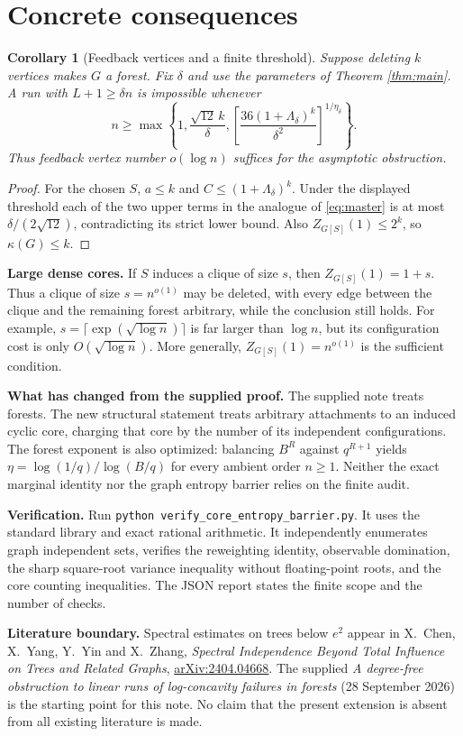 \documentclass[10pt]{article}
\newtheorem{corollary}[theorem]{Corollary}
\begin{document}
\section{Concrete consequences}
\begin{corollary}[Feedback vertices and a finite threshold]
Suppose deleting \(k\) vertices makes \(G\) a forest. Fix \(\delta\) and
use the parameters of Theorem \ref{thm:main}. A run with
\(L+1\ge\delta n\) is impossible whenever
\[
 n\ge\max\left\{1,\frac{\sqrt{12}\,k}{\delta},
       \left[\frac{36(1+\Lambda_\delta)^k}{\delta^2}
                  \right]^{1/\eta_\delta}\right\}.
\]
Thus feedback vertex number \(o(\log n)\) suffices for the asymptotic
obstruction.
\end{corollary}
\begin{proof}
For the chosen \(S\), \(a\le k\) and
\(C\le(1+\Lambda_\delta)^k\). Under the displayed threshold each of
the two upper terms in the analogue of \eqref{eq:master} is at most
\(\delta/(2\sqrt{12})\), contradicting its strict lower bound.
Also \(Z_{G[S]}(1)\le2^k\), so \(\kappa(G)\le k\).
\end{proof}

\noindent\textbf{Large dense cores.} If \(S\) induces a clique of size
\(s\), then \(Z_{G[S]}(1)=1+s\). Thus a clique of size \(s=n^{o(1)}\)
may be deleted, with every edge between the clique and the remaining
forest arbitrary, while the conclusion still holds. For example,
\(s=\lceil\exp(\sqrt{\log n})\rceil\) is far larger than \(\log n\),
but its configuration cost is only \(O(\sqrt{\log n})\).
More generally, \(Z_{G[S]}(1)=n^{o(1)}\) is the sufficient condition.

\medskip
\noindent\textbf{What has changed from the supplied proof.} The supplied
note treats forests. The new structural statement treats arbitrary
attachments to an induced cyclic core, charging that core by the number
of its independent configurations. The forest exponent is also optimized:
balancing \(B^R\) against \(q^{R+1}\) yields
\(\eta=\log(1/q)/\log(B/q)\) for every ambient order \(n\ge1\).
Neither the exact marginal identity nor the graph entropy barrier relies
on the finite audit.

\medskip
\noindent\textbf{Verification.} Run
\texttt{python verify\_core\_entropy\_barrier.py}.
It uses the standard library and exact rational arithmetic. It independently
enumerates graph independent sets, verifies the reweighting identity,
observable domination, the sharp square-root variance inequality without
floating-point roots, and the core counting inequalities. The JSON report
states the finite scope and the number of checks.

\medskip
\noindent\textbf{Literature boundary.} Spectral estimates on trees below
\(e^2\) appear in X.~Chen, X.~Yang, Y.~Yin and X.~Zhang,
\emph{Spectral Independence Beyond Total Influence on Trees and Related
Graphs}, \href{https://arxiv.org/abs/2404.04668}{arXiv:2404.04668}.
The supplied \emph{A degree-free obstruction to linear runs of
log-concavity failures in forests} (28 September 2026) is the starting
point for this note. No claim that the present extension is absent from
all existing literature is made.
\end{document}
